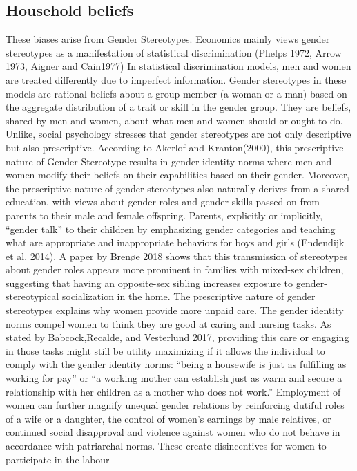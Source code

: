 \documentclass[12pt]{article}
\begin{document}
\subsection{Household beliefs}
These biases arise from Gender Stereotypes. Economics mainly views gender stereotypes as
a manifestation of statistical discrimination (Phelps 1972, Arrow 1973, Aigner and Cain1977)
In statistical discrimination models, men and women are treated differently due to imperfect
information. Gender stereotypes in these models are rational beliefs about a group member (a
woman or a man) based on the aggregate distribution of a trait or skill in the gender group.
They are beliefs, shared by men and women, about what men and women should or ought to
do. Unlike, social psychology stresses that gender stereotypes are not only descriptive but
also prescriptive. According to Akerlof and Kranton(2000), this prescriptive nature of Gender
Stereotype results in gender identity norms where men and women modify their beliefs on
their capabilities based on their gender. Moreover, the prescriptive nature of gender
stereotypes also naturally derives from a shared education, with views about gender roles and
gender skills passed on from parents to their male and female offspring. Parents, explicitly or
implicitly, “gender talk” to their children by emphasizing gender categories and teaching
what are appropriate and inappropriate behaviors for boys and girls (Endendijk et al. 2014).
A paper by Brenøe 2018 shows that this transmission of stereotypes about gender roles
appears more prominent in families with mixed-sex children, suggesting that having an
opposite-sex sibling increases exposure to gender- stereotypical socialization in the home.
The prescriptive nature of gender stereotypes explains why women provide more unpaid care.
The gender identity norms compel women to think they are good at caring and nursing tasks.
As stated by Babcock,Recalde, and Vesterlund 2017, providing this care or engaging in those
tasks might still be utility maximizing if it allows the individual to comply with the gender
identity norms: “being a housewife is just as fulfilling as working for pay” or “a working
mother can establish just as warm and secure a relationship with her children as a mother who
does not work.”
Employment of women can further magnify unequal gender relations by reinforcing dutiful
roles of a wife or a daughter, the control of women’s earnings by male relatives, or continued
social disapproval and violence against women who do not behave in accordance with
patriarchal norms. These create disincentives for women to participate in the labour
\end{document}
